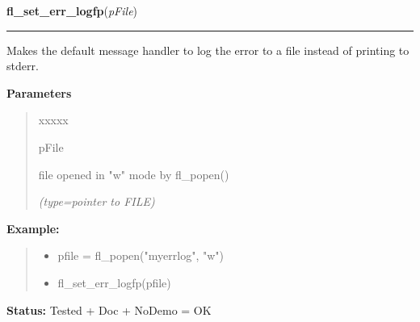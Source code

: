 \hspace{.8\funcindent}\begin{boxedminipage}{\funcwidth}

    \raggedright \textbf{fl\_set\_err\_logfp}(\textit{pFile})

    \vspace{-1.5ex}

    \rule{\textwidth}{0.5\fboxrule}
\setlength{\parskip}{2ex}
    Makes the default message handler to log the error to a file instead of
    printing to stderr.

\setlength{\parskip}{1ex}
      \textbf{Parameters}
      \vspace{-1ex}

      \begin{quote}
        \begin{Ventry}{xxxxx}

          \item[pFile]

          file opened in "w" mode by fl\_popen()

            {\it (type=pointer to FILE)}

        \end{Ventry}

      \end{quote}

\textbf{Example:}
\begin{quote}
  \begin{itemize}

  \item
    \setlength{\parskip}{0.6ex}
pfile = fl\_popen("myerrlog", "w")



  \item fl\_set\_err\_logfp(pfile)



\end{itemize}

\end{quote}

\textbf{Status:} Tested + Doc + NoDemo = OK



    \end{boxedminipage}

    \label{xformslib:flbasic:fl_set_error_handler}

    \vspace{0.5ex}


